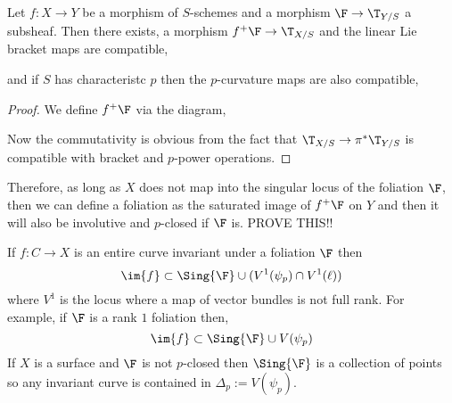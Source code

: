 \documentclass[12pt]{article}
\begin{document}
\begin{prop}
Let $f : X \to Y$ be a morphism of $S$-schemes and a morphism $\F \to \T_{Y/S}$ a subsheaf. Then there exists, a morphism $f^+ \F \to \T_{X/S}$ and the linear Lie bracket maps are compatible,
\begin{center}
\end{center}
and if $S$ has characteristc $p$ then the $p$-curvature maps are also compatible,
\begin{center}
\end{center}
\end{prop}

\begin{proof}
We define $f^+ \F$ via the diagram,
\begin{center}
\end{center}
Now the commutativity is obvious from the fact that $\T_{X/S} \to \pi^* \T_{Y/S}$ is compatible with bracket and $p$-power operations.
\end{proof}

Therefore, as long as $X$ does not map into the singular locus of the foliation $\F$, then we can define a foliation as the saturated image of $f^+ \F$ on $Y$ and then it will also be involutive and $p$-closed if $\F$ is. {\color{red} PROVE THIS!!}


\begin{cor}
If $f : C \to X$ is an entire curve invariant under a foliation $\F$ then 
\[ \im{f} \subset \Sing{\F} \cup (V^1(\psi_p) \cap V^1(\ell)) \]
where $V^1$ is the locus where a map of vector bundles is not full rank. For example, if $\F$ is a rank $1$ foliation then,
\[ \im{f} \subset \Sing{\F} \cup V(\psi_p) \]
If $X$ is a surface and $\F$ is not $p$-closed then $\Sing{\F}$ is a collection of points so any invariant curve is contained in $\Delta_p := V(\psi_p)$.
\end{cor}
\end{document}
